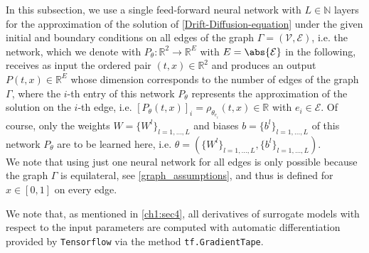 


In this subsection, we use a single feed-forward neural network with $L \in \mathbb{N}$ layers for the approximation of the solution of \cref{Drift-Diffusion-equation} under the given initial and boundary conditions on all edges of the graph $\Gamma = (\mathcal{V}, \mathcal{E})$, i.e. the network, which we denote with $P_{\theta} \colon \mathbb{R}^2 \to \mathbb{R}^{E}$ with $E = \abs{\mathcal{E}}$ in the following, receives as input the ordered pair $(t,x) \in \mathbb{R}^2$ and produces an output $P(t,x) \in \mathbb{R}^{E}$ whose dimension corresponds to the number of edges of the graph $\Gamma$, where the $i$-th entry of this network $P_{\theta}$ represents the approximation of the solution on the $i$-th edge, i.e. $[P_{\theta}(t,x)]_i = \rho_{\theta_{e_i}} \left( t,x \right) \in \mathbb{R}$ with $e_i \in \mathcal{E}$. Of course, only the weights $W = \{ W^l \}_{l = 1, \ldots, L}$ and biases $b = \{ b^l \}_{l = 1, \ldots, L}$ of this network $P_{\theta}$ are to be learned here, i.e. $\theta = (\{ W^l \}_{l = 1, \ldots, L}, \{ b^l \}_{l = 1, \ldots, L})$. \\
We note that using just one neural network for all edges is only possible because the graph $\Gamma$ is equilateral, see \cref{graph_assumptions}, and thus  is defined for $x \in [0,1]$ on every edge. %








We note that, as mentioned in \cref{ch1:sec4}, all derivatives of surrogate models with respect to the input parameters are computed with automatic differentiation provided by \lstinline!Tensorflow! via the method \lstinline!tf.GradientTape!. 


